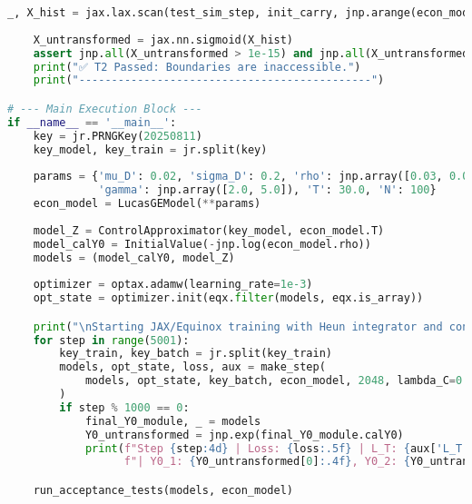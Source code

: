 \documentclass[11pt,letterpaper,oneside]{article}
\theoremstyle{plain}
\theoremstyle{definition}
\theoremstyle{remark}
\begin{document}
\begin{lstlisting}[language=Python, caption={C.5: Training Loop, JIT-compiled Step, and Acceptance Tests.}, label={lst:jax_training_app_appendix}]
    _, X_hist = jax.lax.scan(test_sim_step, init_carry, jnp.arange(econ_model.N))
    
    X_untransformed = jax.nn.sigmoid(X_hist)
    assert jnp.all(X_untransformed > 1e-15) and jnp.all(X_untransformed < 1.0 - 1e-15), "T2 Failed: Boundary hit!"
    print("✅ T2 Passed: Boundaries are inaccessible.")
    print("---------------------------------------------")

# --- Main Execution Block ---
if __name__ == '__main__':
    key = jr.PRNGKey(20250811)
    key_model, key_train = jr.split(key)
    
    params = {'mu_D': 0.02, 'sigma_D': 0.2, 'rho': jnp.array([0.03, 0.04]), 
              'gamma': jnp.array([2.0, 5.0]), 'T': 30.0, 'N': 100}
    econ_model = LucasGEModel(**params)
    
    model_Z = ControlApproximator(key_model, econ_model.T)
    model_calY0 = InitialValue(-jnp.log(econ_model.rho))
    models = (model_calY0, model_Z)
    
    optimizer = optax.adamw(learning_rate=1e-3)
    opt_state = optimizer.init(eqx.filter(models, eqx.is_array))

    print("\nStarting JAX/Equinox training with Heun integrator and consistency loss...")
    for step in range(5001):
        key_train, key_batch = jr.split(key_train)
        models, opt_state, loss, aux = make_step(
            models, opt_state, key_batch, econ_model, 2048, lambda_C=0.5, optimizer=optimizer
        )
        if step % 1000 == 0:
            final_Y0_module, _ = models
            Y0_untransformed = jnp.exp(final_Y0_module.calY0)
            print(f"Step {step:4d} | Loss: {loss:.5f} | L_T: {aux['L_T']:.5f} | L_C: {aux['L_C']:.5f} "
                  f"| Y0_1: {Y0_untransformed[0]:.4f}, Y0_2: {Y0_untransformed[1]:.4f}")

    run_acceptance_tests(models, econ_model)
\end{lstlisting}
\end{document}
